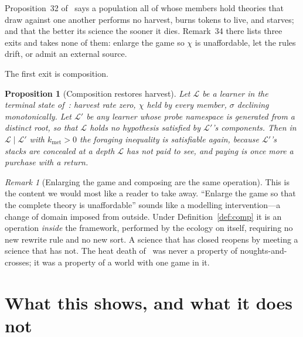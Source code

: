 \documentclass[11pt,a4paper]{article}
\theoremstyle{plain}
\newtheorem{proposition}[theorem]{Proposition}
\theoremstyle{definition}
\theoremstyle{remark}
\newtheorem{remark}[theorem]{Remark}
\newcommand{\Lrn}{\mathcal{L}}
\begin{document}
Proposition~32 of~\cite{game} says a population all of whose members hold theories that draw
against one another performs no harvest, burns tokens to live, and starves; and that the better
its science the sooner it dies. Remark~34 there lists three exits and takes none of them: enlarge
the game so $\chi$ is unaffordable, let the rules drift, or admit an external source.

The first exit is composition.

\begin{proposition}[Composition restores harvest]
Let $\Lrn$ be a learner in the terminal state of~\cite[Prop.~32]{game}: harvest rate zero,
$\chi$ held by every member, $\sigma$ declining monotonically. Let $\Lrn'$ be any learner whose
probe namespace is generated from a distinct root, so that $\Lrn$ holds no hypothesis satisfied
by $\Lrn'$'s components. Then in $\Lrn \mid \Lrn'$ with $k_{\mathrm{met}} > 0$ the foraging
inequality is satisfiable again, because $\Lrn'$'s stacks are concealed at a depth $\Lrn$ has not
paid to see, and paying is once more a purchase with a return.
\end{proposition}

\begin{remark}[Enlarging the game and composing are the same operation]
This is the content we would most like a reader to take away. ``Enlarge the game so that the
complete theory is unaffordable'' sounds like a modelling intervention---a change of domain
imposed from outside. Under Definition~\ref{def:comp} it is an operation \emph{inside} the
framework, performed by the ecology on itself, requiring no new rewrite rule and no new sort. A
science that has closed reopens by meeting a science that has not. The heat death of~\cite{game}
was never a property of noughts-and-crosses; it was a property of a world with one game in it.
\end{remark}

\section{What this shows, and what it does not}\label{sec:notshown}
\end{document}
